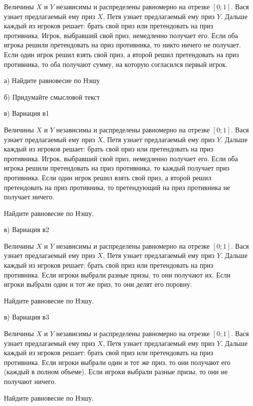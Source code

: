 \begin{problem}

Величины $X$ и $Y$ независимы и распределены равномерно на отрезке $[0;1]$. Вася узнает предлагаемый ему приз $X$, Петя узнает предлагаемый ему приз $Y$. Дальше каждый из игроков решает: брать  свой приз или претендовать на приз противника. Игрок, выбравший свой приз, немедленно получает его. Если оба игрока решили претендовать на приз противника, то никто ничего не получает. Если один игрок решил взять свой приз, а второй решил претендовать на приз противника, то оба получают сумму, на которую согласился первый игрок. \par
а) Найдите равновесие по Нэшу \par
б) Придумайте смысловой текст \par
в) Вариация в1 \par
Величины $X$ и $Y$ независимы и распределены равномерно на отрезке $[0;1]$. Вася узнает предлагаемый ему приз $X$, Петя узнает предлагаемый ему приз $Y$. Дальше каждый из игроков решает: брать  свой приз или претендовать на приз противника. Игрок, выбравший свой приз, немедленно получает его. Если оба игрока решили претендовать на приз противника, то каждый получает приз противника. Если один игрок решил взять свой приз, а второй решил претендовать на приз противника, то претендующий на приз противника не получает ничего. \par
Найдите равновесие по Нэшу.\par
в) Вариация в2 \par
Величины $X$ и $Y$ независимы и распределены равномерно на отрезке $[0;1]$. Вася узнает предлагаемый ему приз $X$, Петя узнает предлагаемый ему приз $Y$. Дальше каждый из игроков решает: брать  свой приз или претендовать на приз противника. Если игроки выбрали разные призы, то они получают их. Если игроки выбрали один и тот же приз, то они делят его поровну.\par
Найдите равновесие по Нэшу.\par
в) Вариация в3 \par
Величины $X$ и $Y$ независимы и распределены равномерно на отрезке $[0;1]$. Вася узнает предлагаемый ему приз $X$, Петя узнает предлагаемый ему приз $Y$. Дальше каждый из игроков решает: брать  свой приз или претендовать на приз противника. Если игроки выбрали один и тот же приз, то они получают его (каждый в полном объеме). Если игроки выбрали разные призы, то они не получают ничего.\par
Найдите равновесие по Нэшу.



\begin{sol}

\end{sol}
\end{problem}



